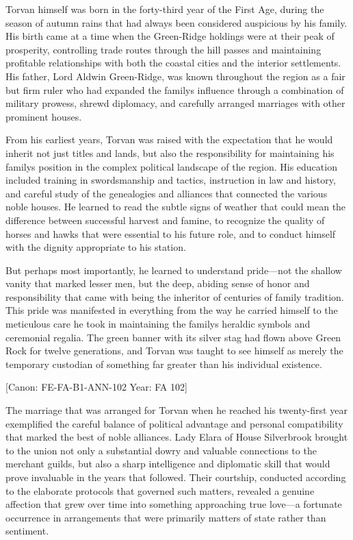Torvan himself was born in the forty-third year of the First Age, during
the season of autumn rains that had always been considered auspicious by
his family. His birth came at a time when the Green-Ridge holdings were
at their peak of prosperity, controlling trade routes through the hill
passes and maintaining profitable relationships with both the coastal
cities and the interior settlements. His father, Lord Aldwin
Green-Ridge, was known throughout the region as a fair but firm ruler
who had expanded the family\textquotesingle s influence through a
combination of military prowess, shrewd diplomacy, and carefully
arranged marriages with other prominent houses.

From his earliest years, Torvan was raised with the expectation that he
would inherit not just titles and lands, but also the responsibility for
maintaining his family\textquotesingle s position in the complex
political landscape of the region. His education included training in
swordsmanship and tactics, instruction in law and history, and careful
study of the genealogies and alliances that connected the various noble
houses. He learned to read the subtle signs of weather that could mean
the difference between successful harvest and famine, to recognize the
quality of horses and hawks that were essential to his future role, and
to conduct himself with the dignity appropriate to his station.

But perhaps most importantly, he learned to understand pride---not the
shallow vanity that marked lesser men, but the deep, abiding sense of
honor and responsibility that came with being the inheritor of centuries
of family tradition. This pride was manifested in everything from the
way he carried himself to the meticulous care he took in maintaining the
family\textquotesingle s heraldic symbols and ceremonial regalia. The
green banner with its silver stag had flown above Green Rock for twelve
generations, and Torvan was taught to see himself as merely the
temporary custodian of something far greater than his individual
existence.

{[}Canon: FE-FA-B1-ANN-102 \textbar{} Year: FA 102{]}

The marriage that was arranged for Torvan when he reached his
twenty-first year exemplified the careful balance of political advantage
and personal compatibility that marked the best of noble alliances. Lady
Elara of House Silverbrook brought to the union not only a substantial
dowry and valuable connections to the merchant guilds, but also a sharp
intelligence and diplomatic skill that would prove invaluable in the
years that followed. Their courtship, conducted according to the
elaborate protocols that governed such matters, revealed a genuine
affection that grew over time into something approaching true love---a
fortunate occurrence in arrangements that were primarily matters of
state rather than sentiment.

